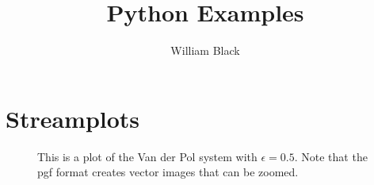 \documentclass[letterpaper, 12pt, reqno]{amsart}
\title{Python Examples}
\author{William Black}
\date{}
\begin{document}
\maketitle

\section{Streamplots}
\begin{figure}[h]
  \begin{center}
    
    \caption{This is a plot of the Van der Pol system with \(\epsilon = 0.5\). Note that the pgf format creates vector images that can be zoomed.}
  \end{center}
\end{figure}
\newpage

\end{document}
